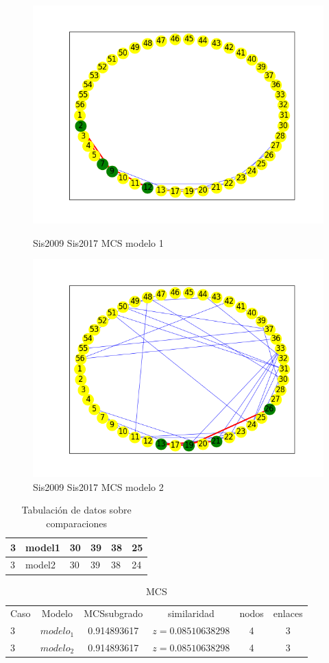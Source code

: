 \begin{figure}[H]
\centering
\includegraphics[width=0.7\linewidth]{images/sis2018/H_sis2018_cmp_sis2009_m1_mcs_mix}
\caption{Sis2009 Sis2017 MCS modelo 1}
\label{fig:c3p3modelo1}

\includegraphics[width=0.7\linewidth]{images/sis2018/H_sis2018_cmp_sis2009_m2_mcs_mix}
\caption{Sis2009 Sis2017 MCS modelo 2}
\label{fig:c3p3modelo2}

\end{figure}


\begin{table}[H]
\centering
\caption{Tabulación de datos sobre comparaciones}
\begin{tabular}[t]{|l|l|l|l|l|l|}
3&model1&30&39&38&25\\
\hline
3&model2&30&39&38&24\\
\hline
\end{tabular}
\label{tab:tabcomparaciones_C_3_P3}
\end{table}


\begin{table}[H]
\centering
\caption{MCS}
\begin{tabular}[t]{lccccc}
\hline
Caso & Modelo & MCSsubgrado & similaridad & nodos & enlaces \\
3 & $modelo_1$ & 0.914893617 & $z=0.08510638298$ & 4 & 3 \\
3 & $modelo_2$ & 0.914893617 & $z=0.08510638298$ & 4 & 3 \\
\hline
\end{tabular}
\label{tab:tabcomparaciones_C_3_P3}
\end{table}

